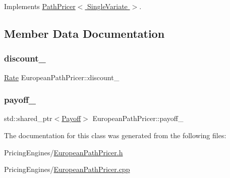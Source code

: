 Implements \hyperlink{class_path_pricer_a14b2a03f259bb56a24a66c9b95bdcf67}{Path\+Pricer$<$ Single\+Variate $>$}.



\subsection{Member Data Documentation}
\hypertarget{class_european_path_pricer_a1bb1874fe4f263bff17a998f0ec9588c}{}\label{class_european_path_pricer_a1bb1874fe4f263bff17a998f0ec9588c} 
\subsubsection{\texorpdfstring{discount\+\_\+}{discount\_}}
{\footnotesize\ttfamily \hyperlink{_name_def_8h_a25bee43a162de339c81f3d1caf6b887d}{Rate} European\+Path\+Pricer\+::discount\+\_\+\hspace{0.3cm}{\ttfamily [private]}}

\hypertarget{class_european_path_pricer_a2023ec56bae32c6db123e8d400d2b0cf}{}\label{class_european_path_pricer_a2023ec56bae32c6db123e8d400d2b0cf} 
\subsubsection{\texorpdfstring{payoff\+\_\+}{payoff\_}}
{\footnotesize\ttfamily std\+::shared\+\_\+ptr$<$\hyperlink{class_payoff}{Payoff}$>$ European\+Path\+Pricer\+::payoff\+\_\+\hspace{0.3cm}{\ttfamily [private]}}



The documentation for this class was generated from the following files\+:\begin{DoxyCompactItemize}
\item 
Pricing\+Engines/\hyperlink{_european_path_pricer_8h}{European\+Path\+Pricer.\+h}\item 
Pricing\+Engines/\hyperlink{_european_path_pricer_8cpp}{European\+Path\+Pricer.\+cpp}\end{DoxyCompactItemize}
